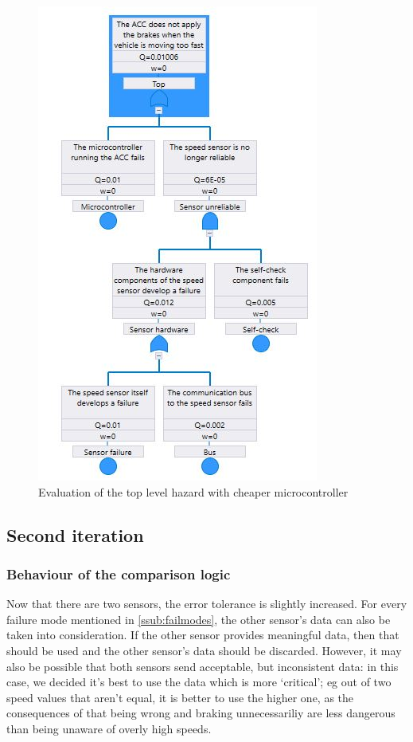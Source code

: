 \documentclass[a4paper]{article}
\begin{document}
\begin{figure}
	\centering
	\includegraphics[width=.47\textwidth]{eval_cheap.jpg}
	\caption{Evaluation of the top level hazard with cheaper
	         microcontroller}%
	\label{fig:eval_cheap}
\end{figure}


\subsection{Second iteration}

\subsubsection{Behaviour of the comparison logic}

Now that there are two sensors, the error tolerance is slightly increased. For
every failure mode mentioned in \cref{ssub:failmodes}, the other sensor's data
can also be taken into consideration. If the other sensor provides meaningful
data, then that should be used and the other sensor's data should be discarded.
However, it may also be possible that both sensors send acceptable, but
inconsistent data: in this case, we decided it's best to use the data which is
more ‘critical’; eg out of two speed values that aren't equal, it is better to
use the higher one, as the consequences of that being wrong and braking
unnecessariliy are less dangerous than being unaware of overly high speeds.
\end{document}
